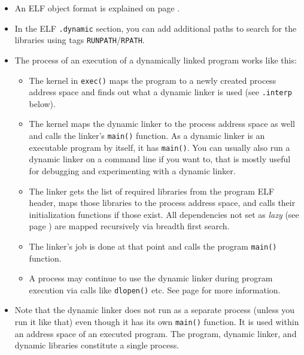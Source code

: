 \begin{itemize}
\item An ELF object format is explained on page \pageref{ELF}.
\item In the ELF \texttt{.dynamic} section, you can add additional paths to
search for the libraries using tags \texttt{RUNPATH}/\texttt{RPATH}.
\item The process of an execution of a dynamically linked program works like
this:
\begin{itemize}
\item The kernel in \texttt{exec()} maps the program to a newly created process
address space and finds out what a dynamic linker is used (see \texttt{.interp}
below).
\item The kernel maps the dynamic linker to the process address space as well
and calls the linker's \texttt{main()} function.  As a dynamic linker is an
executable program by itself, it has \texttt{main()}.  You can usually also run
a dynamic linker on a command line if you want to, that is mostly useful for
debugging and experimenting with a dynamic linker.
\item The linker gets the list of required libraries from the program ELF header,
maps those libraries to the process address space, and calls their initialization
functions if those exist.  All dependencies not set as
\emph{lazy} (see page \pageref{DLOPEN}) are mapped recursively via breadth
first search.
\item The linker's job is done at that point and calls the program
\texttt{main()} function.
\item A process may continue to use the dynamic linker during program execution
via calls like \texttt{dlopen()} etc.  See page \pageref{DLOPEN} for more
information.
\end{itemize}
\item Note that the dynamic linker does not run as a separate process (unless
you run it like that) even though it has its own \texttt{main()} function.
It is used within an address space of an executed program. The program, dynamic
linker, and dynamic libraries constitute a single process.


\end{itemize}
